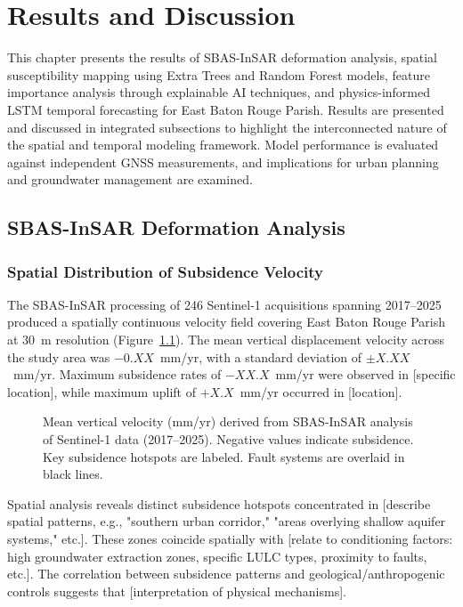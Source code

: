 
\chapter[Results and Discussion]{\centering Results and Discussion}

This chapter presents the results of SBAS-InSAR deformation analysis, spatial susceptibility mapping using Extra Trees and Random Forest models, feature importance analysis through explainable AI techniques, and physics-informed LSTM temporal forecasting for East Baton Rouge Parish. Results are presented and discussed in integrated subsections to highlight the interconnected nature of the spatial and temporal modeling framework. Model performance is evaluated against independent GNSS measurements, and implications for urban planning and groundwater management are examined.

\section{SBAS-InSAR Deformation Analysis}

\subsection{Spatial Distribution of Subsidence Velocity}

The SBAS-InSAR processing of 246 Sentinel-1 acquisitions spanning 2017--2025 produced a spatially continuous velocity field covering East Baton Rouge Parish at 30~m resolution (Figure~\ref{fig:velocity_map}). The mean vertical displacement velocity across the study area was $-0.XX$~mm/yr, with a standard deviation of $\pm X.XX$~mm/yr. Maximum subsidence rates of $-XX.X$~mm/yr were observed in [specific location], while maximum uplift of $+X.X$~mm/yr occurred in [location].

\begin{figure}[!t]
\centering
\caption{Mean vertical velocity (mm/yr) derived from SBAS-InSAR analysis of Sentinel-1 data (2017--2025). Negative values indicate subsidence. Key subsidence hotspots are labeled. Fault systems are overlaid in black lines.}
\label{fig:velocity_map}
\end{figure}

Spatial analysis reveals distinct subsidence hotspots concentrated in [describe spatial patterns, e.g., "southern urban corridor," "areas overlying shallow aquifer systems," etc.]. These zones coincide spatially with [relate to conditioning factors: high groundwater extraction zones, specific LULC types, proximity to faults, etc.]. The correlation between subsidence patterns and geological/anthropogenic controls suggests that [interpretation of physical mechanisms].

